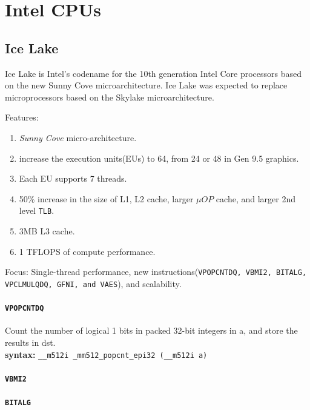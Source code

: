 \documentclass[10pt,onecolumn,conference]{IEEEtran}
\begin{document}
\newcommand{\todo}[1]{\color{red}\textbf{\hl{#1}}\color{black}\xspace}
\newcommand{\rom}[1]{\expandafter{\romannumeral #1\relax}}

\section{Intel CPUs}

\subsection{Ice Lake}
Ice Lake is Intel's codename for the 10th generation Intel Core processors based on the new Sunny Cove microarchitecture. 
Ice Lake was expected to replace microprocessors based on the Skylake microarchitecture.


Features:
\begin{enumerate}
\item \textit{Sunny Cove} micro-architecture.
\item increase the execution units(EUs) to 64, from 24 or 48 in Gen 9.5 graphics.
\item Each EU supports 7 threads.
\item 50\% increase in the size of L1, L2 cache, larger $\mu OP$ cache, and larger 2nd level \texttt{TLB}.
\item 3MB L3 cache.
\item 1 TFLOPS of compute performance.
\end{enumerate}


Focus:
Single-thread performance, new instructions(\texttt{VPOPCNTDQ, VBMI2, BITALG, VPCLMULQDQ, GFNI, and VAES}), and scalability.

\paragraph{\texttt{VPOPCNTDQ}}
Count the number of logical 1 bits in packed 32-bit integers in a, and store the results in dst.\\
\textbf{syntax:} \texttt{\_\_m512i \_mm512\_popcnt\_epi32 (\_\_m512i a)}

\paragraph{\texttt{VBMI2}}

\paragraph{\texttt{BITALG}}
\end{document}
